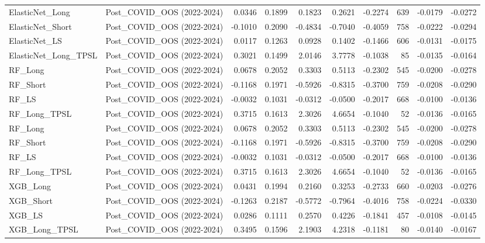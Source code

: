\begin{tabular}{llrrrrrrrr}
\cline{1-10}
ElasticNet\_Long & Post\_COVID\_OOS (2022-2024) & 0.0346 & 0.1899 & 0.1823 & 0.2621 & -0.2274 & 639 & -0.0179 & -0.0272 \\
\cline{1-10}
ElasticNet\_Short & Post\_COVID\_OOS (2022-2024) & -0.1010 & 0.2090 & -0.4834 & -0.7040 & -0.4059 & 758 & -0.0222 & -0.0294 \\
\cline{1-10}
ElasticNet\_LS & Post\_COVID\_OOS (2022-2024) & 0.0117 & 0.1263 & 0.0928 & 0.1402 & -0.1466 & 606 & -0.0131 & -0.0175 \\
\cline{1-10}
ElasticNet\_Long\_TPSL & Post\_COVID\_OOS (2022-2024) & 0.3021 & 0.1499 & 2.0146 & 3.7778 & -0.1038 & 85 & -0.0135 & -0.0164 \\
\cline{1-10}
RF\_Long & Post\_COVID\_OOS (2022-2024) & 0.0678 & 0.2052 & 0.3303 & 0.5113 & -0.2302 & 545 & -0.0200 & -0.0278 \\
\cline{1-10}
RF\_Short & Post\_COVID\_OOS (2022-2024) & -0.1168 & 0.1971 & -0.5926 & -0.8315 & -0.3700 & 759 & -0.0208 & -0.0290 \\
\cline{1-10}
RF\_LS & Post\_COVID\_OOS (2022-2024) & -0.0032 & 0.1031 & -0.0312 & -0.0500 & -0.2017 & 668 & -0.0100 & -0.0136 \\
\cline{1-10}
RF\_Long\_TPSL & Post\_COVID\_OOS (2022-2024) & 0.3715 & 0.1613 & 2.3026 & 4.6654 & -0.1040 & 52 & -0.0136 & -0.0165 \\
\cline{1-10}
RF\_Long & Post\_COVID\_OOS (2022-2024) & 0.0678 & 0.2052 & 0.3303 & 0.5113 & -0.2302 & 545 & -0.0200 & -0.0278 \\
\cline{1-10}
RF\_Short & Post\_COVID\_OOS (2022-2024) & -0.1168 & 0.1971 & -0.5926 & -0.8315 & -0.3700 & 759 & -0.0208 & -0.0290 \\
\cline{1-10}
RF\_LS & Post\_COVID\_OOS (2022-2024) & -0.0032 & 0.1031 & -0.0312 & -0.0500 & -0.2017 & 668 & -0.0100 & -0.0136 \\
\cline{1-10}
RF\_Long\_TPSL & Post\_COVID\_OOS (2022-2024) & 0.3715 & 0.1613 & 2.3026 & 4.6654 & -0.1040 & 52 & -0.0136 & -0.0165 \\
\cline{1-10}
XGB\_Long & Post\_COVID\_OOS (2022-2024) & 0.0431 & 0.1994 & 0.2160 & 0.3253 & -0.2733 & 660 & -0.0203 & -0.0276 \\
\cline{1-10}
XGB\_Short & Post\_COVID\_OOS (2022-2024) & -0.1263 & 0.2187 & -0.5772 & -0.7964 & -0.4016 & 758 & -0.0224 & -0.0330 \\
\cline{1-10}
XGB\_LS & Post\_COVID\_OOS (2022-2024) & 0.0286 & 0.1111 & 0.2570 & 0.4226 & -0.1841 & 457 & -0.0108 & -0.0145 \\
\cline{1-10}
XGB\_Long\_TPSL & Post\_COVID\_OOS (2022-2024) & 0.3495 & 0.1596 & 2.1903 & 4.2318 & -0.1181 & 80 & -0.0140 & -0.0167 \\

\end{tabular}

